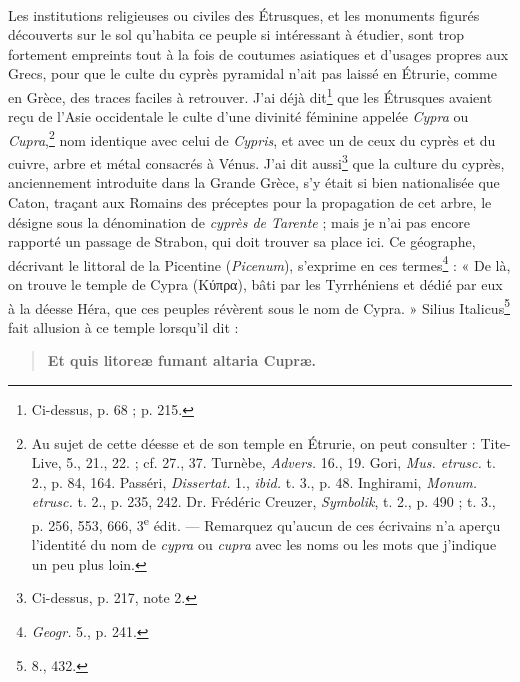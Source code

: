 \documentclass{article}
\begin{document}
\paragraph{}
Les institutions religieuses ou civiles des Étrusques, et les monuments figurés découverts sur le sol qu'habita ce peuple si intéressant à étudier, sont trop fortement empreints tout à la fois de coutumes asiatiques et d'usages propres aux Grecs, pour que le culte du cyprès pyramidal n'ait pas laissé en Étrurie, comme en Grèce, des traces faciles à retrouver. J'ai déjà dit\footnote{Ci-dessus, p. 68 ; p. 215.} que les Étrusques avaient reçu de l'Asie occidentale le culte d'une divinité féminine appelée \emph{Cypra} ou \emph{Cupra},\footnote{Au sujet de cette déesse et de son temple en Étrurie, on peut consulter : Tite-Live, 5., 21., 22. ; cf. 27., 37. Turnèbe, \emph{Advers.} 16., 19. Gori, \emph{Mus. etrusc.} t. 2., p. 84, 164. Passéri, \emph{Dissertat.} 1., \emph{ibid.} t. 3., p. 48. Inghirami, \emph{Monum. etrusc.} t. 2., p. 235, 242. Dr. Frédéric Creuzer, \emph{Symbolik}, t. 2., p. 490 ; t. 3., p. 256, 553, 666, 3\textsuperscript{e} édit. --- Remarquez qu'aucun de ces écrivains n'a aperçu l'identité du nom de \emph{cypra} ou \emph{cupra} avec les noms ou les mots que j'indique un peu plus loin.} nom identique avec celui de \emph{Cypris}, et avec un de ceux du cyprès et du cuivre, arbre et métal consacrés à Vénus. J'ai dit aussi\footnote{Ci-dessus, p. 217, note 2.} que la culture du cyprès, anciennement introduite dans la Grande Grèce, s'y était si bien nationalisée que Caton, traçant aux Romains des préceptes pour la propagation de cet arbre, le désigne sous la dénomination de \emph{cyprès de Tarente} ; mais je n'ai pas encore rapporté un passage de Strabon, qui doit trouver sa place ici. Ce géographe, décrivant le littoral de la Picentine (\emph{Picenum}), s'exprime en ces termes\footnote{\emph{Geogr.} 5., p. 241.} : « De là, on trouve le temple de Cypra (\textgreek{Κύπρα}), bâti par les Tyrrhéniens et dédié par eux à la déesse Héra, que ces peuples révèrent sous le nom de Cypra. » Silius Italicus\footnote{8., 432.} fait allusion à ce temple lorsqu'il dit :

\begin{quotation}\scriptsize\bfseries
Et quis litoreæ fumant altaria Cupræ.
\end{quotation}
\end{document}
